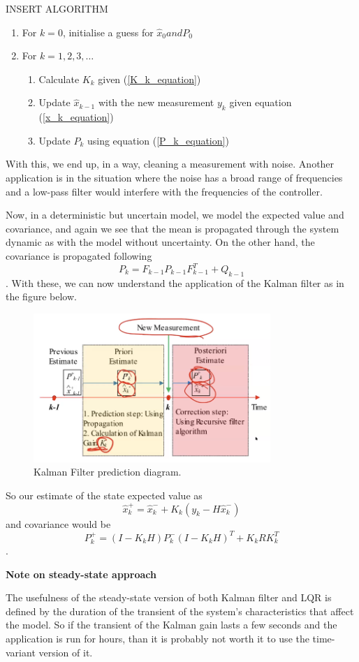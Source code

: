 INSERT ALGORITHM

\begin{enumerate}
    \item For $k=0$, initialise a guess for $\hat{x}_0 and P_0$
    \item For $k=1,2,3,\ldots$
	\begin{enumerate}
	    \item Calculate $K_k$ given (\ref{K_k_equation})
	    \item Update $\hat{x}_{k-1}$ with the new measurement $y_k$ given equation (\ref{x_k_equation})
	    \item Update $P_k$ using equation (\ref{P_k_equation})
	\end{enumerate}
\end{enumerate}

With this, we end up, in a way, cleaning a measurement with noise. Another application is in the situation where the noise has a broad range of frequencies and a low-pass filter would interfere with the frequencies of the controller.

Now, in a deterministic but uncertain model, we model the expected value and covariance, and again we see that the mean is propagated through the system dynamic as with the model without uncertainty. On the other hand, the covariance is propagated following \[
P_k = F_{k-1}P_{k-1}F_{k-1}^{T} + Q_{k-1}
\]. With these, we can now understand the application of the Kalman filter as in the figure below.

\begin{figure}[h]
    \centering
    \includegraphics[width=0.8\textwidth]{figures/kalman_filter_prediction.png}
    \caption{Kalman Filter prediction diagram.}
    \label{fig:kalman_filter_prediction}
\end{figure}

So our estimate of the state expected value as \[
\hat{x}_k^+ = \hat{x}_k^- + K_k\left( y_k - H\hat{x}_k^- \right) 
\] and covariance would be \[
P_k^+ = \left( I - K_kH \right) P_k^- \left( I-K_kH \right)^{T} + K_kRK_k^{T}
\].

\textbf{Note on steady-state approach}

The usefulness of the steady-state version of both Kalman filter and LQR is defined by the duration of the transient of the system's characteristics that affect the model. So if the transient of the Kalman gain lasts a few seconds and the application is run for hours, than it is probably not worth it to use the time-variant version of it.
